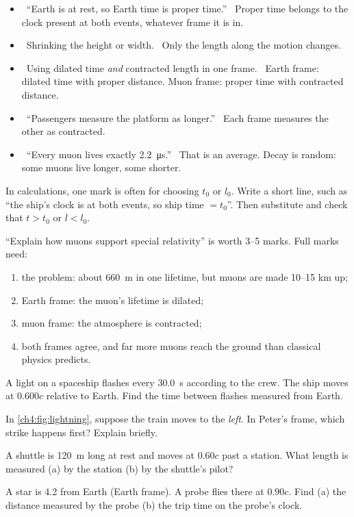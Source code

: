 \begin{mistakes}
\begin{itemize}
  \item \xmark\ ``Earth is at rest, so Earth time is proper time.'' \cmark\ Proper time belongs to
        the clock present at both events, whatever frame it is in.
  \item \xmark\ Shrinking the height or width. \cmark\ Only the length along the motion changes.
  \item \xmark\ Using dilated time \emph{and} contracted length in one frame. \cmark\ Earth frame:
        dilated time with proper distance. Muon frame: proper time with contracted distance.
  \item \xmark\ ``Passengers measure the platform as longer.'' \cmark\ Each frame measures the
        other as contracted.
  \item \xmark\ ``Every muon lives exactly \qty{2.2}{\micro\second}.'' \cmark\ That is an average.
        Decay is random: some muons live longer, some shorter.
\end{itemize}
\end{mistakes}

\begin{examtip}
In calculations, one mark is often for choosing $t_0$ or $l_0$. Write a short line, such as
``the ship's clock is at both events, so ship time $= t_0$''. Then substitute and check that
$t > t_0$ or $l < l_0$.

``Explain how muons support special relativity'' is worth 3--5 marks. Full marks need:
\begin{enumerate}
  \item the problem: about \qty{660}{m} in one lifetime, but muons are made 10--15 km up;
  \item Earth frame: the muon's lifetime is dilated;
  \item muon frame: the atmosphere is contracted;
  \item both frames agree, and far more muons reach the ground than classical physics predicts.
\end{enumerate}
\end{examtip}

\begin{quickcheck}
  \item A light on a spaceship flashes every \qty{30.0}{s} according to the crew. The ship moves at
        $0.600c$ relative to Earth. Find the time between flashes measured from Earth.
  \item In \cref{ch4:fig:lightning}, suppose the train moves to the \emph{left}. In Peter's frame,
        which strike happens first? Explain briefly.
  \item A shuttle is \qty{120}{m} long at rest and moves at $0.60c$ past a station. What length is
        measured (a) by the station (b) by the shuttle's pilot?
  \item A star is \qty{4.2}{\lightyear} from Earth (Earth frame). A probe flies there at $0.90c$.
        Find (a) the distance measured by the probe (b) the trip time on the probe's clock.
\end{quickcheck}

